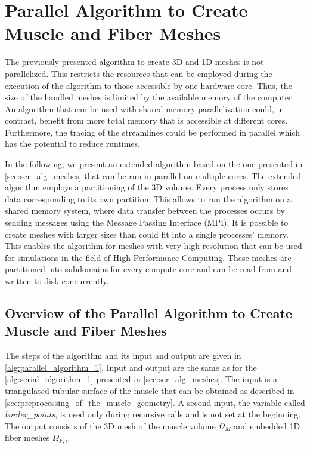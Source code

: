 
\section{Parallel Algorithm to Create Muscle and Fiber Meshes}\label{sec:parallel_algorithm}

The previously presented algorithm to create 3D and 1D meshes is not parallelized. 
This restricts the resources that can be employed during the execution of the algorithm to those accessible by one hardware core.
Thus, the size of the handled meshes is limited by the available memory of the computer.
An algorithm that can be used with shared memory parallelization could, in contrast, benefit from more total memory that is accessible at different cores. Furthermore, the tracing of the streamlines could be performed in parallel which has the potential to reduce runtimes.

In the following, we present an extended algorithm based on the one presented in \cref{sec:ser_alg_meshes} that can be run in parallel on multiple cores. The extended algorithm employs a partitioning of the 3D volume. Every process only stores data corresponding to its own partition. This allows to run the algorithm on a shared memory system, where data transfer between the processes occurs by sending messages using the Message Passing Interface (MPI). It is possible to create meshes with larger sizes than could fit into a single processes' memory. This enables the algorithm for meshes with very high resolution that can be used for simulations in the field of High Performance Computing. 
These meshes are partitioned into subdomains for every compute core and can be read from and written to disk concurrently.

\subsection{Overview of the Parallel Algorithm to Create Muscle and Fiber Meshes}

The steps of the algorithm and its input and output are given in \cref{alg:parallel_algorithm_1}. Input and output are the same as for the \cref{alg:serial_algorithm_1} presented in \cref{sec:ser_alg_meshes}. The input is a triangulated tubular surface of the muscle that can be obtained as described in \cref{sec:preprocessing_of_the_muscle_geometry}. A second input, the variable called \emph{border\_points}, is used only during recursive calls and is not set at the beginning. The output consists of the 3D mesh of the muscle volume $\Omega_M$ and embedded 1D fiber meshes $\Omega_{F,i}$. 

